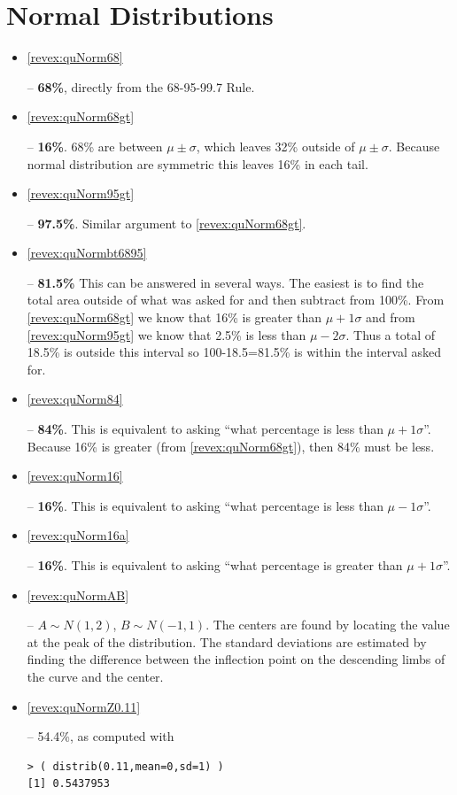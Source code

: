 \documentclass[10pt,openany]{book}\usepackage[]{graphicx}\usepackage[]{color}
\makeatletter
\newenvironment{kframe}{%
 \def\at@end@of@kframe{}%
 \ifinner\ifhmode%
  \def\at@end@of@kframe{\end{minipage}}%
  \begin{minipage}{\columnwidth}%
 \fi\fi%
 \def\FrameCommand##1{\hskip\@totalleftmargin \hskip-\fboxsep
 \colorbox{shadecolor}{##1}\hskip-\fboxsep
     \hskip-\linewidth \hskip-\@totalleftmargin \hskip\columnwidth}%
 \MakeFramed {\advance\hsize-\width
   \@totalleftmargin\z@ \linewidth\hsize
   \@setminipage}}%
 {\par\unskip\endMakeFramed%
 \at@end@of@kframe}
\newenvironment{knitrout}{}{} %
\makeatother
\begin{document}
\section*{Normal Distributions}
\begin{itemize}
  \item \hypertarget{ans:quNorm68}{\ref{revex:quNorm68}} --  \textbf{68\%}, directly from the 68-95-99.7 Rule.
  \item \hypertarget{ans:quNorm68gt}{\ref{revex:quNorm68gt}} --  \textbf{16\%}.  68\% are between $\mu\pm\sigma$, which leaves 32\% outside of $\mu\pm\sigma$.  Because normal distribution are symmetric this leaves 16\% in each tail.
  \item \hypertarget{ans:quNorm95gt}{\ref{revex:quNorm95gt}} --  \textbf{97.5\%}.  Similar argument to \ref{revex:quNorm68gt}.
  \item \hypertarget{ans:quNormbt6895}{\ref{revex:quNormbt6895}} --  \textbf{81.5\%}  This can be answered in several ways.  The easiest is to find the total area outside of what was asked for and then subtract from 100\%.  From \ref{revex:quNorm68gt} we know that 16\% is greater than $\mu+1\sigma$ and from \ref{revex:quNorm95gt} we know that 2.5\% is less than $\mu-2\sigma$.  Thus a total of 18.5\% is outside this interval so 100-18.5=81.5\% is within the interval asked for.
  \item \hypertarget{ans:quNorm84}{\ref{revex:quNorm84}} --  \textbf{84\%}.  This is equivalent to asking ``what percentage is less than $\mu+1\sigma$''.  Because 16\% is greater (from \ref{revex:quNorm68gt}), then 84\% must be less.
  \item \hypertarget{ans:quNorm16}{\ref{revex:quNorm16}} --  \textbf{16\%}.  This is equivalent to asking ``what percentage is less than $\mu-1\sigma$''.
  \item \hypertarget{ans:quNorm16a}{\ref{revex:quNorm16a}} --  \textbf{16\%}.  This is equivalent to asking ``what percentage is greater than $\mu+1\sigma$''.
  \item \hypertarget{ans:quNormAB}{\ref{revex:quNormAB}} --  $A\sim N(1,2)$, $B\sim N(-1,1)$.  The centers are found by locating the value at the peak of the distribution.  The standard deviations are estimated by finding the difference between the inflection point on the descending limbs of the curve and the center.

  \item \hypertarget{ans:quNormZ0.11}{\ref{revex:quNormZ0.11}} -- 54.4\%, as computed with
\begin{knitrout}
\color{fgcolor}\begin{kframe}
\begin{verbatim}
> ( distrib(0.11,mean=0,sd=1) )
[1] 0.5437953
\end{verbatim}
\end{kframe}


\end{knitrout}
\end{itemize}
\end{document}
